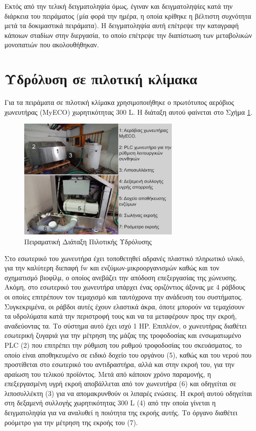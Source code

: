 \documentclass[11pt]{report}
\begin{document}
Εκτός από την τελική δειγματοληψία όμως, έγιναν και δειγματοληψίες κατά την διάρκεια του πειράματος (μία φορά την ημέρα, η οποία κρίθηκε η βέλτιστη συχνότητα μετά τα δοκιμαστικά πειράματα). Η δειγματοληψία αυτή επέτρεψε την καταγραφή κάποιων σταδίων στην διεργασία, το οποίο επέτρεψε την διαπίστωση των μεταβολικών μονοπατιών που ακολουθήθηκαν.

\section{Υδρόλυση σε πιλοτική κλίμακα}
\label{sec:org02312a0}
\label{sec:pilot-exp}

Για τα πειράματα σε πιλοτική κλίμακα χρησιμοποιήθηκε ο πρωτότυπος αερόβιος χωνευτήρας (MyECO) χωρητικότητας 300 L. Η διάταξη αυτού φαίνεται στο Σχήμα \ref{fig:orgefea5d3}.

\begin{figure}[htbp]
\centering
\includegraphics[width=300px]{./pilot_hydrolysis_captioned.png}
\caption{\label{fig:orgefea5d3}Πειραματική Διάταξη Πιλοτικής Υδρόλυσης}
\end{figure}

Στο εσωτερικό του χωνευτήρα έχει τοποθετηθεί αδρανές πλαστικό πληρωτικό υλικό, για την καλύτερη διεπαφή \acrshort{fw} και ενζύμων-μικροοργανισμών καθώς και τον σχηματισμό βιοφίλμ, ο οποίος ανεβάζει την απόδοση επεξεργασίας της χώνευσης. Ακόμη, στο εσωτερικό του χωνευτήρα υπάρχει ένας οριζόντιος άξονας με 4 ράβδους οι οποίες επιτρέπουν τον τεμαχισμό και ταυτόχρονα την ανάδευση του συστήματος. Συγκεκριμένα, οι ράβδοι αυτές έχουν ελαστικά άκρα, όποτε μπορούν να τεμαχίσουν τα υδρολύματα κατά την περιστροφή τους και να τα μεταφέρουν προς την εκροή, αναδεύοντας τα. Το σύστημα αυτό έχει ισχύ 1 HP. Επιπλέον, ο χωνευτήρας διαθέτει εσωτερική ζυγαριά για την μέτρηση της μάζας της τροφοδοσίας και ενσωματωμένο PLC (2) που επιτρέπει την ρύθμιση του ρυθμού τροφοδοσίας του σκευάσματος, το οποίο είναι αποθηκευμένο σε ειδικό δοχείο του οργάνου (5), καθώς και του νερού που προστίθεται στο εσωτερικό του αντιδραστήρα, αλλά και στην εκροή του, για την αραίωση του τελικού προϊόντος. Μετά από κάποιον χρόνο παραμονής, η επεξεργασμένη υγρή εκροή αποβάλλεται από τον χωνευτήρα (6) και οδηγείται σε λιποσυλλέκτη (3) για να απομακρυνθούν οι λιπαρές ενώσεις. Η εκροή αυτού οδηγείται στη δεξαμενή συλλογής χωρητικότητας 300 L (4) από την οποία γίνεται η δειγματοληψία για να αναλυθεί η ποιότητα της εκροής αυτής. Το όργανο διαθέτει ροόμετρο για την μέτρηση της εκροής του (7).
\end{document}
